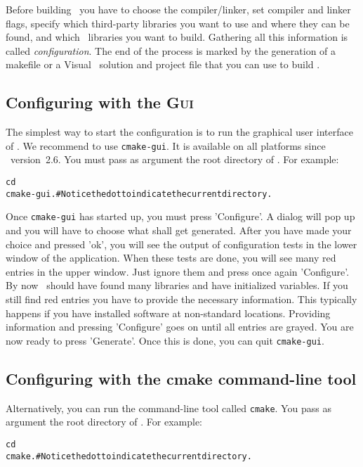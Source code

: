 Before building \cgal\ you have to choose the compiler/linker, 
set compiler and linker flags, specify which
third-party libraries you want to use and where they can be found, and 
which \cgal\ libraries you want to build. Gathering
all this information is called \emph{configuration}. 
The end of the process is marked by the generation of a makefile or a
Visual \CC\ solution and project file that you can use to build \cgal.

\subsection{Configuring \cgal{} with the \cmake{} \textsc{Gui} }

The simplest way to start the configuration is to run the graphical
user interface of \cmake. We recommend to use \texttt{cmake-gui}. It
is available on all platforms since \cmake\ version~2.6. You must pass as 
argument the root directory of \cgal. For example:

{\ccTexHtml{}{}
\begin{alltt}
  cd  \cgalrel
  cmake-gui . # Notice the dot to indicate the current directory.
\end{alltt}
}

Once \texttt{cmake-gui} has started up, you must press 'Configure'. 
A dialog will pop up and you will have to choose what shall get generated.
After you have made your choice and pressed 'ok', you will see
the output of configuration tests in the lower window of the application. 
When these tests are done, you will see many
red entries in the upper window. Just ignore them and press once again 'Configure'. 
By now \cmake\ should have found many libraries and have initialized variables. 
If you still find red entries you have to provide the necessary information. 
This typically happens if you have installed software at non-standard locations.
Providing information and pressing 'Configure' goes on until 
all entries are grayed. You are now ready to press 'Generate'. Once this is
done, you can quit \texttt{cmake-gui}.

\subsection{Configuring \cgal{} with the cmake command-line tool }

Alternatively, you can run the command-line tool called
\texttt{cmake}. You pass as argument the root directory of
\cgal. For example:

{\ccTexHtml{}{}
\begin{alltt}
  cd  \cgalrel
  cmake . # Notice the dot to indicate the current directory.
\end{alltt}
}

